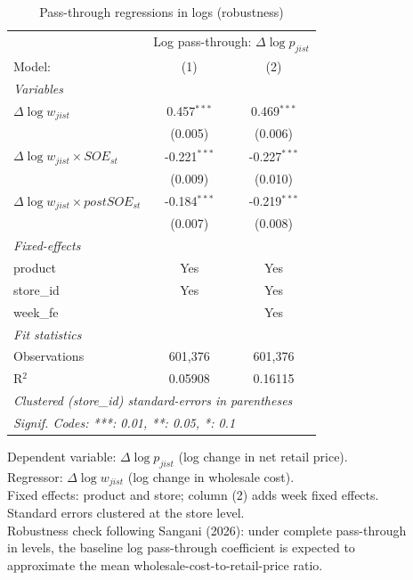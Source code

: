 
\begin{table}[htbp]
   \caption{\label{tab:passthrough_log} Pass-through regressions in logs (robustness)}
   \centering
   \begin{tabular}{lcc}
      \tabularnewline \midrule \midrule
       & \multicolumn{2}{c}{Log pass-through: $\Delta \log p_{jist}$} \\ 
      Model:                                        & (1)            & (2)\\  
      \midrule
      \emph{Variables}\\
      $\Delta \log w_{jist}$                        & 0.457$^{***}$  & 0.469$^{***}$\\   
                                                    & (0.005)        & (0.006)\\   
      $\Delta \log w_{jist} \times SOE_{st}$        & -0.221$^{***}$ & -0.227$^{***}$\\   
                                                    & (0.009)        & (0.010)\\   
      $\Delta \log w_{jist} \times postSOE_{st}$    & -0.184$^{***}$ & -0.219$^{***}$\\   
                                                    & (0.007)        & (0.008)\\   
      \midrule
      \emph{Fixed-effects}\\
      product                                       & Yes            & Yes\\  
      store\_id                                     & Yes            & Yes\\  
      week\_fe                                      &                & Yes\\  
      \midrule
      \emph{Fit statistics}\\
      Observations                                  & 601,376        & 601,376\\  
      R$^2$                                         & 0.05908        & 0.16115\\  
      \midrule \midrule
      \multicolumn{3}{l}{\emph{Clustered (store\_id) standard-errors in parentheses}}\\
      \multicolumn{3}{l}{\emph{Signif. Codes: ***: 0.01, **: 0.05, *: 0.1}}\\
   \end{tabular}
   
   \par \raggedright 
   Dependent variable: $\Delta \log p_{jist}$ (log change in net retail price).\\
   Regressor: $\Delta \log w_{jist}$ (log change in wholesale cost).\\
   Fixed effects: product and store; column (2) adds week fixed effects.\\
   Standard errors clustered at the store level.\\
   Robustness check following Sangani (2026): under complete pass-through\\
   in levels, the baseline log pass-through coefficient is expected to\\
   approximate the mean wholesale-cost-to-retail-price ratio.
\end{table}



